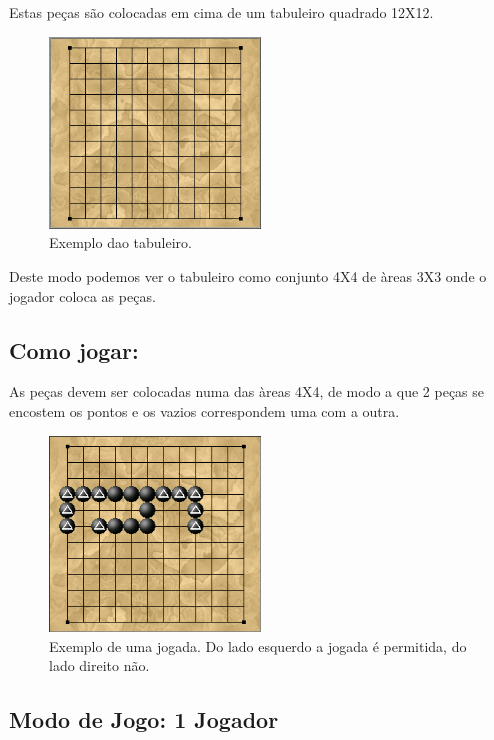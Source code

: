 \documentclass[a4paper]{article}
\begin{document}
Estas peças são colocadas em cima de um tabuleiro quadrado 12X12.

\begin{figure}[h!]
  \centering
      \includegraphics[width=0.5\textwidth]{Board}
  \caption{Exemplo dao tabuleiro.}
\end{figure}

Deste modo podemos ver o tabuleiro como conjunto 4X4 de àreas 3X3 onde o jogador coloca as peças.

\subsection{Como jogar:}

As peças devem ser colocadas numa das àreas 4X4, de modo a que 2 peças se encostem os pontos e os vazios correspondem uma com a outra.

\begin{figure}[h!]
  \centering
      \includegraphics[width=0.5\textwidth]{Example}
  \caption{Exemplo de uma jogada. Do lado esquerdo a jogada é permitida, do lado direito não.}
\end{figure}

\subsection{Modo de Jogo: 1 Jogador}
\end{document}
